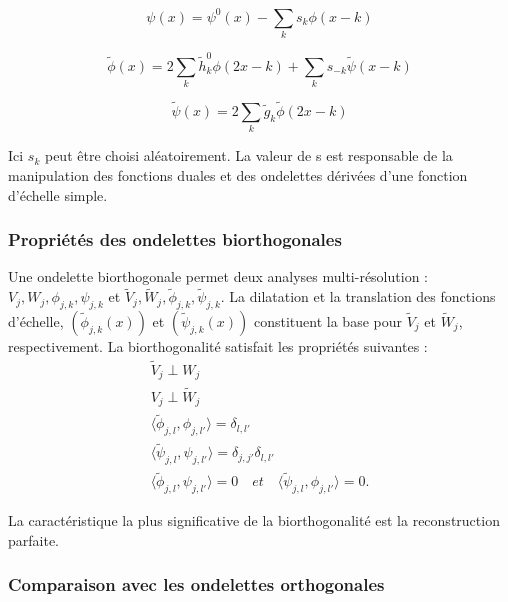 \begin{equation}
    \psi (x) = \psi^0 (x) - \sum_k s_k\phi (x - k) 
\end{equation}

\begin{equation}
    \tilde{\phi} (x) = 2\sum_k\tilde{h}_k^0\phi (2x - k) + \sum_k s_{-k}\tilde{\psi} (x - k) 
\end{equation}

\begin{equation}
    \tilde{\psi} (x) = 2\sum_k\tilde{g}_k\tilde{\phi} (2x - k)
\end{equation}

Ici \(s_k\) peut être choisi aléatoirement. La valeur de s est responsable de la manipulation des fonctions duales et des ondelettes dérivées d'une fonction d'échelle simple.

\subsubsection{Propriétés des ondelettes biorthogonales}
Une ondelette biorthogonale permet deux analyses multi-résolution : \(V_{j},W_{j},\phi_{j,k},\psi_{j,k}\) et \(\tilde{V}_{j},\tilde{W}_{j},\tilde{\phi}_{j,k},\tilde{\psi}_{j,k}\). La dilatation et la translation des fonctions d'échelle, \((\tilde{\phi}_{j,k}(x))\) et \((\tilde{\psi}_{j,k}(x))\) constituent la base pour \(\tilde{V}_{j}\) et \(\tilde{W}_{j}\), respectivement. La biorthogonalité satisfait les propriétés suivantes :
\enlargethispage{\baselineskip}
\begin{equation}
    \begin{array}{l}
        \tilde{V}_j\perp W_j\\ V_j\perp \tilde{W}_j\\ 
        \langle\tilde{\phi}_{j,l},\phi_{j,l'}\rangle = \delta_{l,l'}\\
        \langle\tilde{\psi}_{j,l},\psi_{j,l'}\rangle = \delta_{j,j'}\delta_{l,l'}\\
        \langle \tilde{\phi}_{j,l},\psi_{j,l'} \rangle = 0\quad et \quad \langle \tilde{\psi}_{j,l},\phi_{j,l'}\rangle = 0. 
    \end{array} 
\end{equation}

La caractéristique la plus significative de la biorthogonalité est la reconstruction parfaite.

\subsubsection{Comparaison avec les ondelettes orthogonales}


